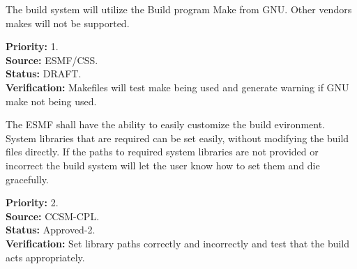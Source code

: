 

The build system will utilize the Build program Make from
GNU.  Other vendors makes will not be supported.
\begin{reqlist}
{\bf Priority:} 1. \\
{\bf Source:} ESMF/CSS. \\
{\bf Status:} DRAFT. \\
{\bf Verification:} Makefiles will test make being used and generate
warning if GNU make not being used.
\end{reqlist}

The ESMF shall have the ability to easily customize the build evironment. 
System libraries that are required can be set easily, without modifying 
the build files directly. If the paths to required system libraries 
are not provided or incorrect the build system will let the user know 
how to set them and die gracefully.
\begin{reqlist}
{\bf Priority:} 2. \\
{\bf Source:} CCSM-CPL. \\
{\bf Status:} Approved-2. \\
{\bf Verification:} Set library paths correctly and incorrectly and test that 
the build acts appropriately.
\end{reqlist}

